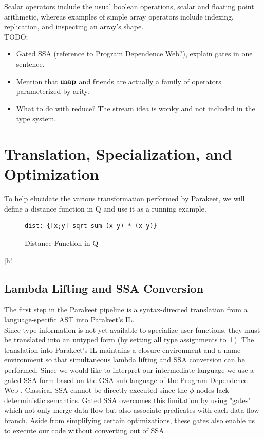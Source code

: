 \documentclass[preprint]{sigplanconf}
\begin{document}
Scalar operators include the usual boolean operations, scalar and floating point arithmetic, whereas examples of simple array operators include indexing, replication, and inspecting an array's shape. 
\\TODO: 
\begin{itemize}
\item Gated SSA (reference to Program Dependence Web?), explain gates in one sentence. 
\item Mention that $\mbox{\textbf{map}}$ and friends are actually a family of operators parameterized by arity. 
\item What to do with reduce? The stream idea is wonky and not included in the type system. 
\end{itemize} 


\section{Translation, Specialization, and Optimization}
\label{Compilation}
To help elucidate the various transformation performed by Parakeet, we will define a distance function in Q and use it as a running example. 
\begin{figure}[h!]

    \begin{lstlisting}[numbers=none]
    dist: {[x;y] sqrt sum (x-y) * (x-y)}
    \end{lstlisting}
    \caption{Distance Function in Q}
\end{figure}[h!]

\subsection{Lambda Lifting and SSA Conversion } 
The first step in the Parakeet pipeline is a syntax-directed translation from a language-specific AST into Parakeet's IL.\\
Since type information is not yet available to specialize user functions, they must be translated into an untyped form (by setting all type assignments to $\bot$). 
The translation into Parakeet's IL maintains a closure environment and a name environment so that simultaneous lambda lifting and SSA conversion can be performed. 
Since we would like to interpret our intermediate language we use a gated SSA form based on the GSA sub-language of the Program Dependence Web \cite{Ott90}. Classical SSA cannot be directly executed since the $\phi$-nodes lack deterministic semantics. Gated SSA overcomes this limitation by using "gates" which not only merge data flow but also associate predicates with each data flow branch. Aside from simplifying certain optimizations, these gates also enable us to execute our code without converting out of SSA. 
\end{document}
